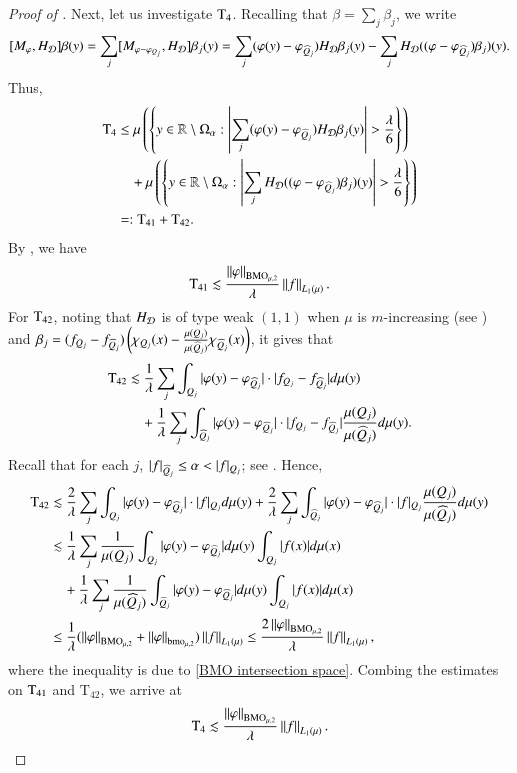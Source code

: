 \documentclass[leqno]{amsart}
\begin{document}
\begin{proof}[Proof of ]
Next, let us investigate ${\rm T}_{4}$. Recalling that $\displaystyle \beta=\sum_{j}\beta_{j}$, we write
$$[M_{\varphi},H_{{\mathcal D}}]\beta(y)=\sum_{j}[M_{\varphi-\varphi_{Q_{j}}},H_{{\mathcal D}}]\beta_{j}(y)
=\sum_{j}(\varphi(y)-\varphi_{\widehat{Q}_{j}})H_{{\mathcal D}}\beta_{j}(y)-\sum_{j}H_{{\mathcal D}}((\varphi-\varphi_{\widehat{Q}_{j}})\beta_{j})(y).$$
Thus,
\begin{align*}
{\rm T}_{4}
&\leq\mu\left(\set{y\in\RR\setminus\Omega_{\alpha}:\left|\sum_{j}(\varphi(y)-\varphi_{\wh{Q}_{j}})H_{\D}\beta_{j}(y)\right|>\frac{\lambda}{6}}\right)\\
&\quad+\mu\left(\set{y\in\RR\setminus\Omega_{\alpha}:\left|\sum_{j}H_{\D}((\varphi-\varphi_{\wh{Q}_{j}})\beta_{j})(y)\right|>\frac{\lambda}{6}}\right)\\
&=:{\rm T}_{41}+{\rm T}_{42}.
\end{align*}
By , we have
\begin{align*}
{\rm T}_{41}\lesssim\frac{\left\| \varphi \right\|_{{\rm BMO}_{\mu,2}}}{\lambda}\left\| f \right\|_{L_{1}(\mu)}.
\end{align*}
For ${\rm T}_{42}$, noting that $H_{{\mathcal D}}$ is of type weak $(1,1)$ when $\mu$ is $m$-increasing (see \cite[Theorem 2.5]{LMP2014}) and $\beta_{j}=(f_{Q_{j}}-f_{\widehat{Q}_{j}})
\left(\chi_{Q_{j}}(x)-\frac{\mu(Q_{j})}{\mu(\widehat{Q}_{j})}\chi_{\widehat{Q}_{j}}(x)\right)$, it gives that
\begin{align*}
{\rm T}_{42}
&\lesssim\frac{1}{\lambda}\sum_{j}\int_{Q_{j}}|\varphi(y)-\varphi_{\widehat{Q}_{j}}|\cdot
|f_{Q_{j}}-f_{\widehat{Q}_{j}}|d\mu(y)\\
&\quad+\frac{1}{\lambda}\sum_{j}\int_{\widehat{Q}_{j}}|\varphi(y)-\varphi_{\widehat{Q}_{j}}|\cdot
|f_{Q_{j}}-f_{\widehat{Q}_{j}}|\frac{\mu(Q_{j})}{\mu(\widehat{Q}_{j})}d\mu(y).
\end{align*}
Recall that for each $j$, $|f|_{\wh{Q}_{j}}\leq\alpha<|f|_{Q_{j}}$; see . Hence,
\begin{align*}
{\rm T}_{42}
&\lesssim\frac{2}{\lambda}\sum_{j}\int_{Q_{j}}|\varphi(y)-\varphi_{\widehat{Q}_{j}}|\cdot
|f|_{Q_{j}}d\mu(y)
+\frac{2}{\lambda}\sum_{j}\int_{\widehat{Q}_{j}}|\varphi(y)-\varphi_{\widehat{Q}_{j}}|
\cdot|f|_{Q_{j}}\frac{\mu(Q_{j})}{\mu(\widehat{Q}_{j})}d\mu(y)\\
&\lesssim\frac{1}{\lambda}\sum_{j}\frac{1}{\mu(Q_{j})}\int_{Q_{j}}|\varphi(y)-\varphi_{\widehat{Q}_{j}}|
d\mu(y)\int_{Q_{j}}|f(x)|d\mu(x)\\
&\quad+\frac{1}{\lambda}\sum_{j}\frac{1}{\mu(\widehat{Q}_{j})}\int_{\widehat{Q}_{j}}|\varphi(y)-\varphi_{\widehat{Q}_{j}}|d\mu(y)
\int_{Q_{j}}|f(x)|d\mu(x)\\
&\leq\frac{1}{\lambda}(\left\| \varphi \right\|_{{\rm BMO}_{\mu,2}}+\left\| \varphi \right\|_{{\rm bmo}_{\mu,2}})\left\| f \right\|_{L_{1}(\mu)}\leq \frac{2\left\| \varphi \right\|_{{\rm BMO}_{\mu,2}}}{\lambda} \left\| f \right\|_{L_{1}(\mu)},
\end{align*}
where the inequality is due to \eqref{BMO intersection space}. Combing the estimates on ${\rm T}_{41}$ and $\mathrm{T}_{42}$, we arrive at
\begin{align*}
{\rm T}_{4}\lesssim\frac{\left\| \varphi \right\|_{{\rm BMO}_{\mu,2}}}{\lambda}\left\| f \right\|_{L_{1}(\mu)}.
\end{align*} 




\end{proof}
\end{document}
